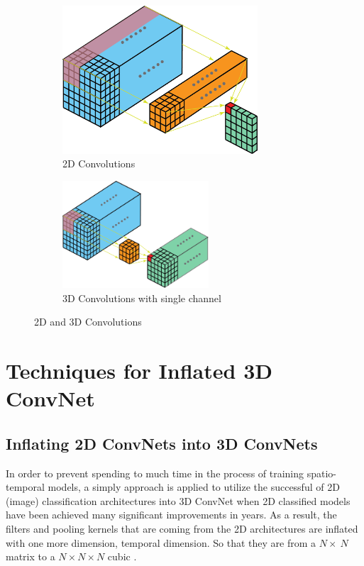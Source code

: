 \documentclass[a4paper, 12pt]{article}
\begin{document}
\begin{figure}[H]
    \begin{subfigure}[b]{0.4\textwidth}
        \centering
        \includegraphics[width=0.8\textwidth]{2D Conv.png}
        \caption{2D Convolutions}
        \label{a}
    \end{subfigure}
    \hfill
    \begin{subfigure}[b]{0.6\textwidth}
        \centering
        \includegraphics[width=0.6\textwidth]{3D - single channel.png}
        \caption{3D Convolutions with single channel}
        \label{b}
    \end{subfigure}
    \hfill
    \caption{2D and 3D Convolutions}
    \label{Figure 2D 3D}
\end{figure}

\section{Techniques for Inflated 3D ConvNet}
\subsection{Inflating 2D ConvNets into 3D ConvNets}
In order to prevent spending to much time in the process of training spatio-temporal models, a simply approach is applied to utilize the successful of 2D (image) classification architectures into 3D ConvNet when 2D classified models have been achieved many significant improvements in years. As a result, the filters and pooling kernels that are coming from the 2D architectures are inflated with one more dimension, temporal dimension. So that they are from a $N \times\ N$ matrix to a $N \times N \times N$ cubic \citep{carreira2017quo}.
\end{document}
